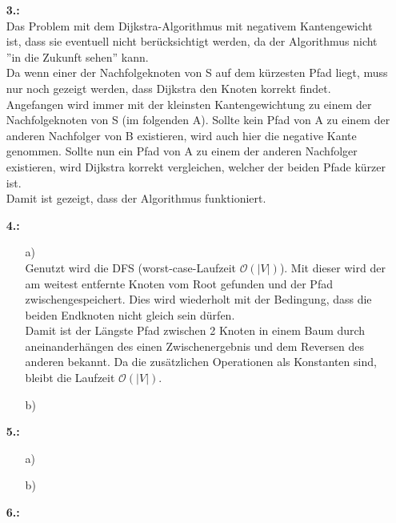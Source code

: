 \documentclass[a4paper,11pt,fleqn]{scrartcl}
\begin{document}
\begin{enumerate}
		\item[\textbf{3.:}] \quad \\
			Das Problem mit dem Dijkstra-Algorithmus mit negativem Kantengewicht ist, dass sie eventuell nicht
			berücksichtigt werden, da der Algorithmus nicht ''in die Zukunft sehen'' kann. \\
			Da wenn einer der Nachfolgeknoten von S auf dem kürzesten Pfad liegt, muss nur noch gezeigt werden, 
			dass Dijkstra den Knoten korrekt findet. \\
			Angefangen wird immer mit der kleinsten Kantengewichtung zu einem der Nachfolgeknoten von S (im 
			folgenden A). Sollte kein Pfad von A zu einem der anderen Nachfolger von B existieren, wird auch hier
			die negative Kante genommen. Sollte nun ein Pfad von A zu einem der anderen Nachfolger existieren, 
			wird Dijkstra korrekt vergleichen, welcher der beiden Pfade kürzer ist. \\
			Damit ist gezeigt, dass der Algorithmus funktioniert.
		\item[\textbf{4.:}]
		\begin{enumerate}
			\item[a)] \quad \\
				Genutzt wird die DFS (worst-case-Laufzeit \(\mathcal{O}(|V|)\)). Mit dieser wird der am weitest 
				entfernte Knoten vom Root gefunden und der Pfad zwischengespeichert. Dies wird wiederholt mit der 
				Bedingung, dass die beiden Endknoten nicht gleich sein dürfen. \\
				Damit ist der Längste Pfad zwischen 2 Knoten in einem Baum durch aneinanderhängen des einen 
				Zwischenergebnis und dem Reversen des anderen bekannt. Da die zusätzlichen Operationen 
				als Konstanten sind, bleibt die Laufzeit \(\mathcal{O}(|V|)\). \\
			\item[b)] \quad \\
				\todo
		\end{enumerate}
		\item[\textbf{5.:}]
		\begin{enumerate}
			\item[a)] \quad \\
				\todo
			\item[b)] \quad \\
				\todo
		\end{enumerate}
		\item[\textbf{6.:}] \quad \\
			\todo
	\end{enumerate}
\end{document}
